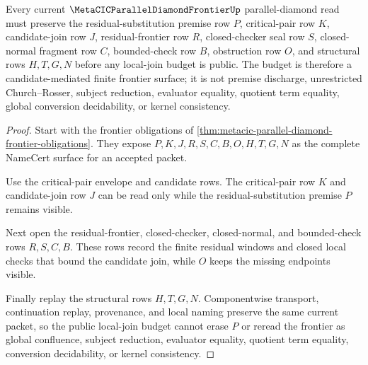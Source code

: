 \begin{theorem}
\label{thm:metacic-parallel-diamond-frontier-current-premise-join-budget}
Every current $\MetaCICParallelDiamondFrontierUp$ parallel-diamond read must preserve the residual-substitution premise row $P$, critical-pair row $K$, candidate-join row $J$, residual-frontier row $R$, closed-checker seal row $S$, closed-normal fragment row $C$, bounded-check row $B$, obstruction row $O$, and structural rows $H,T,G,N$ before any local-join budget is public. The budget is therefore a candidate-mediated finite frontier surface; it is not premise discharge, unrestricted Church--Rosser, subject reduction, evaluator equality, quotient term equality, global conversion decidability, or kernel consistency.
\end{theorem}
\begin{proof}
Start with the frontier obligations of \autoref{thm:metacic-parallel-diamond-frontier-obligations}. They expose $P,K,J,R,S,C,B,O,H,T,G,N$ as the complete NameCert surface for an accepted packet.

Use the critical-pair envelope and candidate rows. The critical-pair row $K$ and candidate-join row $J$ can be read only while the residual-substitution premise $P$ remains visible.

Next open the residual-frontier, closed-checker, closed-normal, and bounded-check rows $R,S,C,B$. These rows record the finite residual windows and closed local checks that bound the candidate join, while $O$ keeps the missing endpoints visible.

Finally replay the structural rows $H,T,G,N$. Componentwise transport, continuation replay, provenance, and local naming preserve the same current packet, so the public local-join budget cannot erase $P$ or reread the frontier as global confluence, subject reduction, evaluator equality, quotient term equality, conversion decidability, or kernel consistency.
\end{proof}
